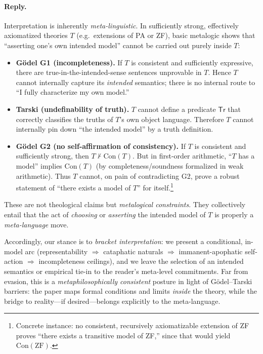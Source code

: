 \documentclass[11pt]{article}
\theoremstyle{upright}
\begin{document}
\paragraph{Reply.}
Interpretation is inherently \emph{meta-linguistic}. In sufficiently strong, effectively axiomatized theories \(T\) (e.g.\ extensions of PA or ZF), basic metalogic shows that “asserting one’s own intended model” cannot be carried out purely inside \(T\):
\begin{itemize}[leftmargin=2em]
  \item \textbf{Gödel G1 (incompleteness).} If \(T\) is consistent and sufficiently expressive, there are true-in-the-intended-sense sentences unprovable in \(T\). Hence \(T\) cannot internally capture its \emph{intended} semantics; there is no internal route to “I fully characterize my own model.”
  \item \textbf{Tarski (undefinability of truth).} \(T\) cannot define a predicate \(\mathsf{Tr}\) that correctly classifies the truths of \(T\)’s own object language. Therefore \(T\) cannot internally pin down “the intended model” by a truth definition.
  \item \textbf{Gödel G2 (no self-affirmation of consistency).} If \(T\) is consistent and sufficiently strong, then \(T \nvdash \mathrm{Con}(T)\). But in first-order arithmetic, “\(T\) has a model” implies \(\mathrm{Con}(T)\) (by completeness/soundness formalized in weak arithmetic). Thus \(T\) cannot, on pain of contradicting G2, prove a robust statement of “there exists a model of \(T\)” for itself.\footnote{Concrete instance: no consistent, recursively axiomatizable extension of ZF proves “there exists a transitive model of ZF,” since that would yield \(\mathrm{Con}(\mathrm{ZF})\).}
\end{itemize}
These are not theological claims but \emph{metalogical constraints}. They collectively entail that the act of \emph{choosing} or \emph{asserting} the intended model of \(T\) is properly a \emph{meta-language} move.

Accordingly, our stance is to \emph{bracket interpretation}: we present a conditional, in-model arc (representability \(\Rightarrow\) cataphatic naturals \(\Rightarrow\) immanent-apophatic self-action \(\Rightarrow\) incompleteness ceilings), and we leave the selection of an intended semantics or empirical tie-in to the reader’s meta-level commitments. Far from evasion, this is a \emph{metaphilosophically consistent} posture in light of Gödel–Tarski barriers: the paper maps formal conditions and limits \emph{inside} the theory, while the bridge to reality—if desired—belongs explicitly to the meta-language.
\end{document}
